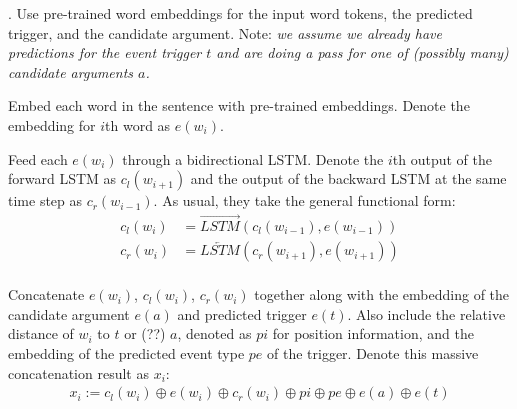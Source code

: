 \documentclass[11pt]{article}
\begin{document}
\myspace
\p {}. Use pre-trained word embeddings for the input word tokens, the predicted trigger, and the candidate argument. Note: \textit{we assume we already have predictions for the event trigger $t$ and are doing a pass for one of (possibly many) candidate arguments $a$.}


\begin{compactenum}
	\item Embed each word in the sentence with pre-trained embeddings. Denote the embedding for $i$th word as $e(w_i)$. 
	
	\item Feed each $e(w_i)$ through a bidirectional LSTM. Denote the $i$th output of the forward LSTM as $c_l(w_{i+1})$ and the output of the backward LSTM at the same time step as $c_r(w_{i - 1})$. As usual, they take the general functional form:
	\begin{align}
	c_l(w_i) &= \overrightarrow{LSTM}\left(c_l(w_{i - 1}), e(w_{i-1}) \right) \\
	c_r(w_i) &= \overleftarrow{LSTM}\left(c_r(w_{i + 1}), e(w_{i+1}) \right) \\
	\end{align}
	
	\item Concatenate $e(w_i)$, $c_l(w_i)$, $c_r(w_i)$ together along with the embedding of the candidate argument $e(a)$ and predicted trigger $e(t)$. Also include the relative distance of $w_i$ to $t$ or (??) $a$, denoted as $pi$ for position information, and the embedding of the predicted event type $pe$ of the trigger. Denote this massive concatenation result as $x_i$:
	\begin{align}
	x_i := c_l(w_i) \oplus e(w_i) \oplus c_r(w_i) \oplus pi \oplus pe \oplus e(a) \oplus e(t) \label{fat-concat}
	\end{align}
	
\end{compactenum}
\end{document}
